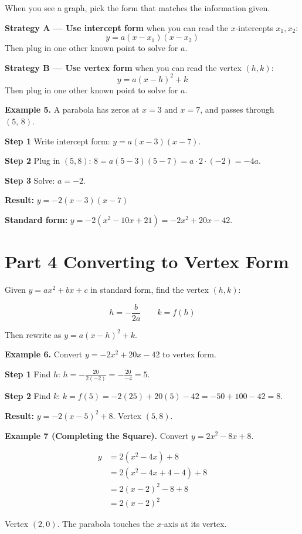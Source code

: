 \documentclass[11pt]{article}
\begin{document}
When you see a graph, pick the form that matches the information given.

\textbf{Strategy A --- Use intercept form} when you can read the $x$-intercepts $x_1, x_2$:
\[
  y = a(x - x_1)(x - x_2)
\]
Then plug in one other known point to solve for $a$.

\textbf{Strategy B --- Use vertex form} when you can read the vertex $(h,k)$:
\[
  y = a(x - h)^2 + k
\]
Then plug in one other known point to solve for $a$.

\begin{exbox}
\textbf{Example 5.} A parabola has zeros at $x = 3$ and $x = 7$, and passes through $(5,\,8)$.

\textbf{Step 1} Write intercept form: $y = a(x-3)(x-7)$.

\textbf{Step 2} Plug in $(5,8)$: \quad $8 = a(5-3)(5-7) = a \cdot 2 \cdot (-2) = -4a$.

\textbf{Step 3} Solve: $a = -2$.

\textbf{Result:} $y = -2(x-3)(x-7)$

\textbf{Standard form:} $y = -2(x^2 - 10x + 21) = -2x^2 + 20x - 42$.
\end{exbox}

\section*{Part 4 \quad Converting to Vertex Form}

Given $y = ax^2 + bx + c$ in standard form, find the vertex $(h,k)$:

\[
  \boxed{h = -\frac{b}{2a}} \qquad \boxed{k = f(h)}
\]

Then rewrite as $y = a(x-h)^2 + k$.

\begin{exbox}
\textbf{Example 6.} Convert $y = -2x^2 + 20x - 42$ to vertex form.

\textbf{Step 1} Find $h$: $\displaystyle h = -\frac{20}{2(-2)} = -\frac{20}{-4} = 5$.

\textbf{Step 2} Find $k$: $k = f(5) = -2(25) + 20(5) - 42 = -50 + 100 - 42 = 8$.

\textbf{Result:} $y = -2(x-5)^2 + 8$. \quad Vertex $(5,8)$.
\end{exbox}

\begin{exbox}
\textbf{Example 7 (Completing the Square).} Convert $y = 2x^2 - 8x + 8$.

\begin{align*}
y &= 2(x^2 - 4x) + 8 \\
  &= 2(x^2 - 4x + 4 - 4) + 8 \\
  &= 2(x-2)^2 - 8 + 8 \\
  &= 2(x-2)^2
\end{align*}

Vertex $(2, 0)$. The parabola touches the $x$-axis at its vertex.
\end{exbox}
\end{document}
